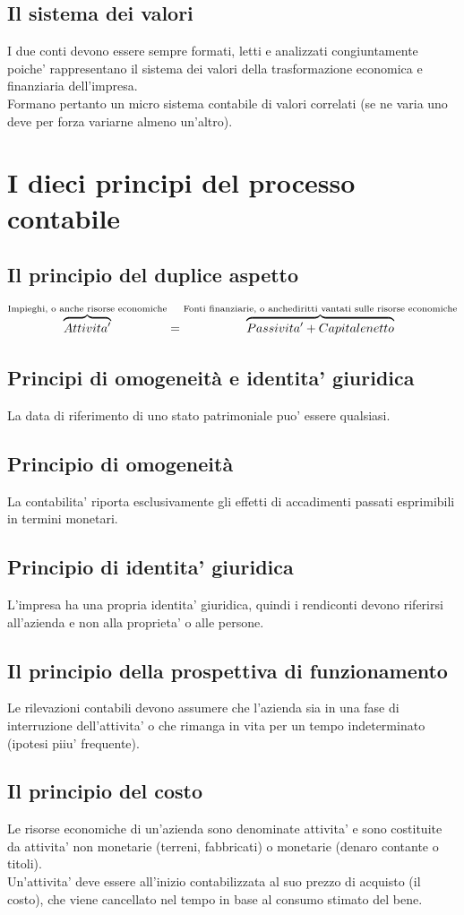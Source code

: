 \documentclass{report}
\begin{document}
	\subsection{Il sistema dei valori}
	I due conti devono essere sempre formati, letti e analizzati congiuntamente poiche' rappresentano il sistema dei valori della trasformazione economica e finanziaria dell'impresa.
	\medskip \\Formano pertanto un micro sistema contabile di valori correlati (se ne varia uno deve per forza variarne almeno un'altro).
	\section{I dieci principi del processo contabile}
	\subsection{Il principio del duplice aspetto}
	\[
	\overbrace{Attivita'}^\text{Impieghi, o anche risorse economiche} = \overbrace{Passivita' + Capitale netto}^\text{Fonti finanziarie, o anche\\diritti vantati sulle risorse economiche}
	\]
	\subsection{Principi di omogeneità e identita' giuridica}
	La data di riferimento di uno stato patrimoniale puo' essere qualsiasi.
	\subsection{Principio di omogeneità} La contabilita' riporta esclusivamente gli effetti di accadimenti passati esprimibili in termini monetari.
	\subsection{Principio di identita' giuridica} L'impresa ha una propria identita' giuridica, quindi i rendiconti devono riferirsi all'azienda e non alla proprieta' o alle persone.
	\subsection{Il principio della prospettiva di funzionamento}
	Le rilevazioni contabili devono assumere che l'azienda sia in una fase di interruzione dell'attivita' o che rimanga in vita per un tempo indeterminato (ipotesi piiu' frequente).
	\subsection{Il principio del costo}
	Le risorse economiche di un'azienda sono denominate attivita' e sono costituite da attivita' non monetarie (terreni, fabbricati) o monetarie (denaro contante o titoli).
	\medskip \\Un'attivita' deve essere all'inizio contabilizzata al suo prezzo di acquisto (il costo), che viene cancellato nel tempo in base al consumo stimato del bene.
\end{document}

